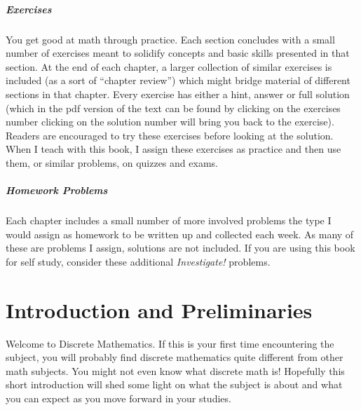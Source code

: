 \documentclass[10pt,]{book}
\theoremstyle{plain}
\theoremstyle{definition}
\theoremstyle{definition}
\theoremstyle{definition}
\numberwithin{equation}{section}
\begin{document}
\paragraph[Exercises]{Exercises}\hypertarget{paragraphs-4}{}

  You get good at math through practice. Each section concludes with a small number of exercises meant to solidify concepts and basic skills presented in that section. At the end of each chapter, a larger collection of similar exercises is included (as a sort of ``chapter review'') which might bridge material of different sections in that chapter. Every exercise has either a hint, answer or full solution (which in the pdf version of the text can be found by clicking on the exercises number \textendash{} clicking on the solution number will bring you back to the exercise). Readers are encouraged to try these exercises before looking at the solution. When I teach with this book, I assign these exercises as practice and then use them, or similar problems, on quizzes and exams.
\typeout{************************************************}
\typeout{************************************************}
\paragraph[Homework Problems]{Homework Problems}\hypertarget{paragraphs-5}{}

       Each chapter includes a small number of more involved problems \textendash{} the type I would assign as homework to be written up and collected each week. As many of these are problems I assign, solutions are not included. If you are using this book for self study, consider these additional \emph{Investigate!} problems.
\setcounter{tocdepth}{1}
\renewcommand*\contentsname{Contents}
\tableofcontents
\mainmatter
\typeout{************************************************}
\typeout{************************************************}
\chapter[Introduction and Preliminaries]{Introduction and Preliminaries}\label{ch_intro}
\typeout{************************************************}
\typeout{************************************************}

      Welcome to Discrete Mathematics. If this is your first time encountering the subject, you will probably find discrete mathematics quite different from other math subjects. You might not even know what discrete math is! Hopefully this short introduction
      will shed some light on what the subject is about and what you can expect as you move forward in your studies.
\typeout{************************************************}
\typeout{************************************************}
\end{document}
